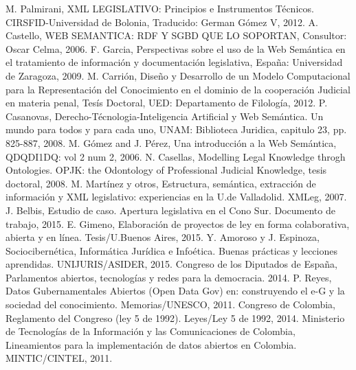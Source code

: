 \documentclass[conference]{IEEEtran}\usepackage[]{graphicx}\usepackage[]{color}
\begin{document}
\begin{thebibliography}{1}
	
	M. Palmirani, XML LEGISLATIVO: Principios e Instrumentos Técnicos. CIRSFID-Universidad de Bolonia, Traducido: German Gómez V, 2012. 
	A. Castello, WEB SEMANTICA: RDF Y SGBD QUE LO SOPORTAN, Consultor: Oscar Celma, 2006.
	F. Garcia, Perspectivas sobre el uso de la Web Semántica en el tratamiento de información y documentación legislativa, España: Universidad de Zaragoza, 2009.
	M. Carrión, Diseño y Desarrollo de un Modelo Computacional para la Representación del Conocimiento en el dominio de la cooperación Judicial en materia penal, Tesís Doctoral, UED: Departamento de Filología, 2012.
	P. Casanovas, Derecho-Técnologia-Inteligencia Artificial y Web Semántica. Un mundo para todos y para cada uno, UNAM: Biblioteca Juridica, capitulo 23, pp. 825-887, 2008.
	M. Gómez and J. Pérez, Una introducción a la Web Semántica, QDQDI1DQ: vol 2 num 2, 2006.
	N. Casellas, Modelling Legal Knowledge throgh Ontologies. OPJK: the Odontology of Professional Judicial Knowledge, tesis doctoral, 2008. 
	M. Martínez y otros, Estructura, semántica, extracción de información y XML legislativo: experiencias en la U.de Valladolid. XMLeg, 2007. 	
	J. Belbis, Estudio de caso. Apertura legislativa en el Cono Sur. Documento de trabajo, 2015. 	
	E. Gimeno, Elaboración de proyectos de ley en forma colaborativa, abierta y en línea. Tesis/U.Buenos Aires, 2015.	
	Y. Amoroso y J. Espinoza, Sociocibernética, Informática Jurídica e Infoética. Buenas prácticas y lecciones aprendidas. UNIJURIS/ASIDER, 2015.
	Congreso de los Diputados de España, Parlamentos abiertos, tecnologías y redes para la democracia. 2014.    
	P. Reyes, Datos Gubernamentales Abiertos (Open Data Gov) en: construyendo el e-G y la sociedad del conocimiento. Memorias/UNESCO, 2011.
	Congreso de Colombia, Reglamento del Congreso (ley 5 de 1992). Leyes/Ley 5 de 1992, 2014. 
	Ministerio de Tecnologías de la Información y las Comunicaciones de Colombia, Lineamientos para la implementación de datos abiertos en Colombia.  MINTIC/CINTEL, 2011. 
\end{thebibliography}
\end{document}
